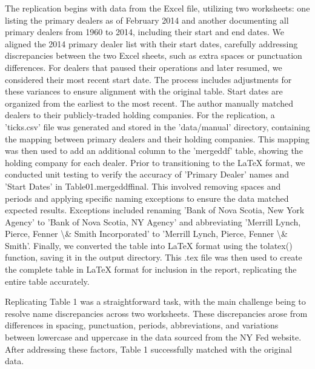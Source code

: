 \documentclass{article}
\begin{document}
The replication begins with data from the Excel file, utilizing two worksheets: one listing the primary dealers as of February 2014 and another documenting all primary dealers from 1960 to 2014, including their start and end dates. We aligned the 2014 primary dealer list with their start dates, carefully addressing discrepancies between the two Excel sheets, such as extra spaces or punctuation differences.  For dealers that paused their operations and later resumed, we considered their most recent start date. The process includes adjustments for these variances to ensure alignment with the original table. Start dates are organized from the earliest to the most recent. The author manually matched dealers to their publicly-traded holding companies. For the replication, a 'ticks.csv' file was generated and stored in the 'data/manual' directory, containing the mapping between primary dealers and their holding companies. This mapping was then used to add an additional column to the 'mergeddf' table, showing the holding company for each dealer. Prior to transitioning to the LaTeX format, we conducted unit testing to verify the accuracy of 'Primary Dealer' names and 'Start Dates' in Table01.mergeddffinal. This involved removing spaces and periods and applying specific naming exceptions to ensure the data matched expected results. Exceptions included renaming 'Bank of Nova Scotia, New York Agency' to 'Bank of Nova Scotia, NY Agency' and abbreviating 'Merrill Lynch, Pierce, Fenner \textbackslash{}& Smith Incorporated' to 'Merrill Lynch, Pierce, Fenner \textbackslash{}& Smith'. Finally, we converted the table into LaTeX format using the tolatex() function, saving it in the output directory. This .tex file was then used to create the complete table in LaTeX format for inclusion in the report, replicating the entire table accurately.

Replicating Table 1 was a straightforward task, with the main challenge being to resolve name discrepancies across two worksheets. These discrepancies arose from differences in spacing, punctuation, periods, abbreviations, and variations between lowercase and uppercase in the data sourced from the NY Fed website. After addressing these factors, Table 1 successfully matched with the original data.

\clearpage
\end{document}
